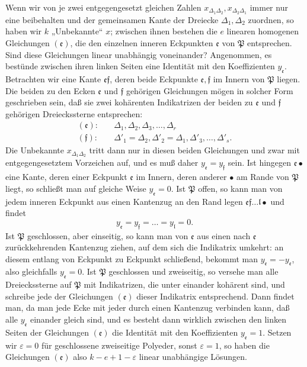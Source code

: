 \documentclass{article}
\begin{document}
Wenn wir von je zwei entgegengesetzt gleichen Zahlen $x_{\Delta_1 \Delta_2}, x_{\Delta_2 \Delta_1}$ immer nur eine beibehalten und der gemeinsamen Kante der Dreiecke $\Delta_1, \Delta_2$ zuordnen, so haben wir $k$ „Unbekannte“ $x$; zwischen ihnen bestehen die $e$ linearen homogenen Gleichungen $(\mathfrak{e})$, die den einzelnen inneren Eckpunkten $\mathfrak{e}$ von $\mathfrak{P}$ entsprechen. Sind diese Gleichungen linear unabhängig voneinander? Angenommen, es bestünde zwischen ihren linken Seiten eine Identität mit den Koeffizienten $y_{\mathfrak{e}}$. Betrachten wir eine Kante $\mathfrak{e}\mathfrak{f}$, deren beide Eckpunkte $\mathfrak{e}, \mathfrak{f}$ im Innern von $\mathfrak{P}$ liegen. Die beiden zu den Ecken $\mathfrak{e}$ und $\mathfrak{f}$ gehörigen Gleichungen mögen in solcher Form geschrieben sein, daß sie zwei kohärenten Indikatrizen der beiden zu $\mathfrak{e}$ und $\mathfrak{f}$ gehörigen Dreieckssterne entsprechen:
\[ \begin{aligned} (\mathfrak{e})\colon & \quad \Delta_1, \Delta_2, \Delta_3, \dots, \Delta_r \\ (\mathfrak{f})\colon & \quad \Delta'_1 = \Delta_2, \Delta'_2 = \Delta_1, \Delta'_3, \dots, \Delta'_s. \end{aligned} \]
Die Unbekannte $x_{\Delta_1 \Delta_2}$ tritt dann nur in diesen beiden Gleichungen und zwar mit entgegengesetztem Vorzeichen auf, und es muß daher $y_{\mathfrak{e}} = y_{\mathfrak{f}}$ sein. Ist hingegen $\mathfrak{e}\bullet$ eine Kante, deren einer Eckpunkt $\mathfrak{e}$ im Innern, deren anderer $\bullet$ am Rande von $\mathfrak{P}$ liegt, so schließt man auf gleiche Weise $y_{\mathfrak{e}} = 0$. Ist $\mathfrak{P}$ offen, so kann man von jedem inneren Eckpunkt aus einen Kantenzug an den Rand legen $\mathfrak{e}\mathfrak{f}\dots\mathfrak{l}\bullet$ und findet
\[ y_{\mathfrak{e}} = y_{\mathfrak{f}} = \dots = y_{\mathfrak{l}} = 0. \]
Ist $\mathfrak{P}$ geschlossen, aber einseitig, so kann man von $\mathfrak{e}$ aus einen nach $\mathfrak{e}$ zurückkehrenden Kantenzug ziehen, auf dem sich die Indikatrix umkehrt: an diesem entlang von Eckpunkt zu Eckpunkt schließend, bekommt man $y_{\mathfrak{e}} = - y_{\mathfrak{e}}$, also gleichfalls $y_{\mathfrak{e}} = 0$. Ist $\mathfrak{P}$ geschlossen und zweiseitig, so versehe man alle Dreieckssterne auf $\mathfrak{P}$ mit Indikatrizen, die unter einander kohärent sind, und schreibe jede der Gleichungen $(\mathfrak{e})$ dieser Indikatrix entsprechend. Dann findet man, da man jede Ecke mit jeder durch einen Kantenzug verbinden kann, daß alle $y_{\mathfrak{e}}$ einander gleich sind, und es besteht dann wirklich zwischen den linken Seiten der Gleichungen $(\mathfrak{e})$ die Identität mit den Koeffizienten $y_{\mathfrak{e}} = 1$. Setzen wir $\varepsilon = 0$ für geschlossene zweiseitige Polyeder, sonst $\varepsilon = 1$, so haben die Gleichungen $(\mathfrak{e})$ also $k - e + 1 - \varepsilon$ linear unabhängige Lösungen.
\end{document}
